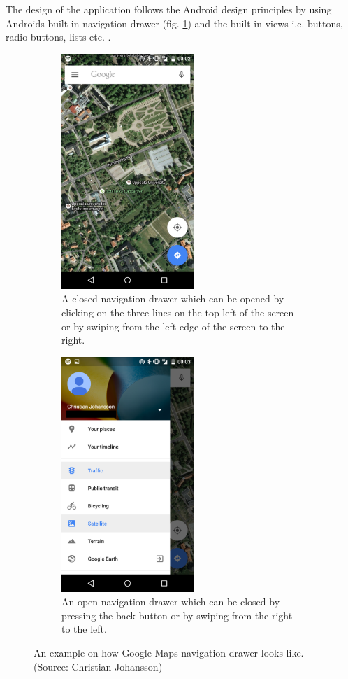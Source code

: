 \documentclass[12pt,a4paper,notitlepage]{report}
\begin{document}
The design of the application follows the Android design principles by using Androids built in navigation drawer (fig. \ref{fig:example_nav_drawer}) and the built in views i.e. buttons, radio buttons, lists etc. \cite{android_design}.

\begin{figure}[htb!]
\centering
\begin{subfigure}{.45\textwidth}
  \centering
  \includegraphics[width=50mm]{images/no_nav_drawer.png}
  \caption{A closed navigation drawer which can be opened by clicking on the three lines on the top left of the screen or by swiping from the left edge of the screen to the right.}
\end{subfigure}\hfill
\begin{subfigure}{.45\textwidth}
  \centering
  \includegraphics[width=50mm]{images/nav_drawer.png}
  \caption{An open navigation drawer which can be closed by pressing the back button or by swiping from the right to the left.}
\end{subfigure}
\caption[Navigation drawer example]{An example on how Google Maps navigation drawer looks like. (Source: Christian Johansson)}
\label{fig:example_nav_drawer}
\end{figure}
\end{document}
